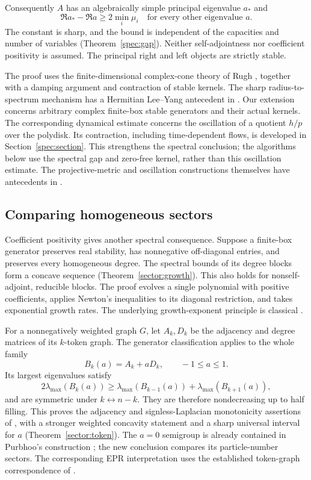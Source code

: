 \documentclass[reqno]{amsart}
\theoremstyle{definition}
\theoremstyle{remark}
\begin{document}
Consequently $A$ has an algebraically simple principal eigenvalue $a_*$
and
\begin{equation}\label{intro:gap}
 \Re a_*-\Re a\geq2\min_i\mu_i
 \quad\text{for every other eigenvalue }a.
\end{equation}
The constant is sharp, and the bound is independent of the capacities
and number of variables (Theorem~\ref{spec:gap}). Neither self-adjointness
nor coefficient positivity is assumed. The principal right and left
objects are strictly stable.

The proof uses the finite-dimensional complex-cone theory of Rugh
\cite{Rugh10}, together with a damping argument and contraction of stable
kernels. The sharp radius-to-spectrum mechanism has a Hermitian
Lee--Yang antecedent in \cite{BGLW26}. Our extension concerns arbitrary
complex finite-box stable generators and their actual kernels.
The corresponding dynamical estimate concerns the oscillation of a
quotient $h/p$ over the polydisk. Its contraction, including
time-dependent flows, is developed in Section~\ref{spec:section}.
This strengthens the spectral conclusion; the algorithms below use
the spectral gap and zero-free kernel, rather than this oscillation estimate.
The projective-metric and oscillation constructions themselves have
antecedents in \cite{Dubois09,GaubertQu15}.

\subsection{Comparing homogeneous sectors}

Coefficient positivity gives another spectral consequence. Suppose a
finite-box generator preserves real stability, has nonnegative
off-diagonal entries, and preserves every homogeneous degree.
The spectral bounds of its degree blocks form a concave sequence
(Theorem~\ref{sector:growth}). This also holds for nonself-adjoint,
reducible blocks. The proof evolves a single polynomial with positive
coefficients, applies Newton's inequalities to its diagonal restriction,
and takes exponential growth rates. The underlying growth-exponent
principle is classical \cite{Branden10Discrete}.

For a nonnegatively weighted graph \(G\), let \(A_k,D_k\) be the
adjacency and degree matrices of its \(k\)-token graph. The generator
classification applies to the whole family
\[
 B_k(a)=A_k+aD_k,\qquad -1\le a\le1.
\]
Its largest eigenvalues satisfy
\[
 2\lambda_{\max}(B_k(a))
 \ge\lambda_{\max}(B_{k-1}(a))+\lambda_{\max}(B_{k+1}(a)),
\]
and are symmetric under \(k\leftrightarrow n-k\).
They are therefore nondecreasing up to half filling. This proves
the adjacency and signless-Laplacian monotonicity assertions of
\cite[Conjectures~5--6]{APS26}, with a stronger weighted concavity
statement and a sharp universal interval for \(a\)
(Theorem~\ref{sector:token}).
The \(a=0\) semigroup is already contained in Purbhoo's construction
\cite{Purbhoo18}; the new conclusion compares its particle-number
sectors. The corresponding EPR interpretation uses the established
token-graph correspondence of \cite{APS26}.
\end{document}
